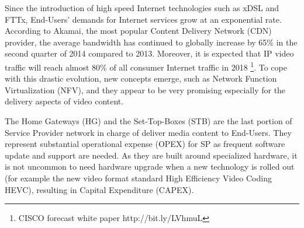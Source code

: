 Since the introduction of high speed Internet technologies such as xDSL and FTTx, End-Users' demands for Internet services grow at an exponential rate.
According to Akamai, the most popular Content Delivery Network (CDN) provider, the average bandwidth has continued to globally increase by 65\% in the second quarter of 2014 \cite{_akamais_2014} compared to 2013. 
Moreover, it is expected that IP video traffic will reach almost 80\% of all consumer Internet traffic in 2018 \footnote{CISCO forecast white paper http://bit.ly/LVhmuL }. To cope with this drastic evolution, new concepts emerge, such as Network Function Virtualization (NFV), and they appear to be very promising especially for the delivery aspects of video content.


The Home Gateways (HG) and the Set-Top-Boxes (STB) are the last portion of Service Provider network in charge of deliver media content to End-Users. 
They represent substantial operational expense (OPEX) for SP as frequent software update and support are needed. 
As they are built around specialized hardware, it is not uncommon to need hardware upgrade when a new technology is rolled out (for example the new video format standard  High Efficiency Video Coding HEVC), resulting in Capital Expenditure (CAPEX).


